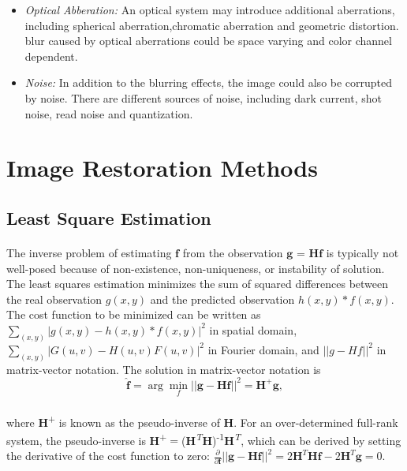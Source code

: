 \documentclass[a4paper]{book}
\begin{document}
\begin{itemize}
		\item \textit{Optical Abberation:} An optical system may introduce additional aberrations, including spherical aberration,chromatic aberration and geometric distortion. blur caused by optical aberrations could be space varying and color channel dependent.
		\item \textit{Noise:} In addition to the blurring effects, the image could also be corrupted by noise. There are different sources of noise, including dark current, shot noise, read noise and quantization.
	\end{itemize}
	

	\section{\Large Image Restoration Methods}\label{secIR}
	
	\subsection{Least Square Estimation}
	\paragraph*{}The inverse problem of estimating $ \textbf{f} $ from the observation $ \textbf{g = Hf} $ is typically not well-posed because of non-existence, non-uniqueness, or instability of solution. The least squares estimation minimizes the sum of squared differences between the real observation $ g(x,y) $ and the predicted observation $ h(x,y) \ast f(x,y) $. The cost function to be minimized can be written as $ \sum_{(x,y)} |g(x,y)-h(x,y)\ast f(x,y)|^{2}$ in spatial domain, $ \sum_{(x,y)} |G(u,v)-H(u,v)F(u,v)|^{2} $ in Fourier domain, and $ ||g - Hf||^{2} $ in matrix-vector notation.\cite{Fletcher00opt} The solution in matrix-vector notation is 
\begin{equation}
\label{eq3.4}
\hat{\textbf{f}} = \arg\min_{f} ||\textbf{g} - \textbf{Hf}||^{2} = \textbf{H}^{+}\textbf{g},
\end{equation}
\paragraph*{}where \textbf{H}\textsuperscript{+} is known as the pseudo-inverse of \textbf{H}. For an over-determined full-rank system, the pseudo-inverse is \textbf{H}\textsuperscript{+}$=$(\textbf{H}\textsuperscript{\textit{T}}\textbf{H})\textsuperscript{-1}\textbf{H}\textsuperscript{\textit{T}}, which can be derived by setting the derivative of the cost function to zero: $\frac{\partial}{\partial{\textbf{f}}}||\textbf{g}-\textbf{Hf}||^{2} = 2\textbf{H}^{T}\textbf{Hf}-2\textbf{H}^{T}\textbf{g} = 0$. 
	
\end{document}
